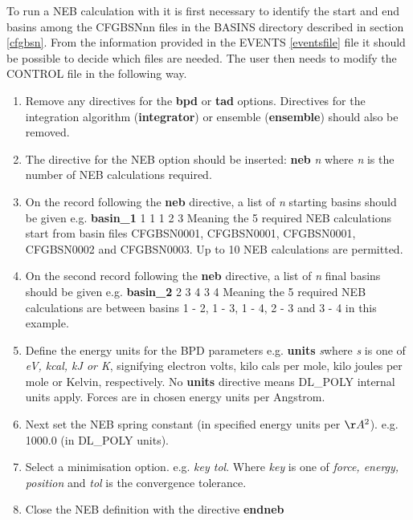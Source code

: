 To run a NEB calculation with \D{} it is first necessary to identify the
start and end basins among the CFGBSNnn files in the BASINS directory
described in section \ref{cfgbsn}. From the information provided in
the EVENTS \ref{eventsfile} file it should be possible to decide which
files are needed. The user then needs to modify the CONTROL file in
the following way.
\begin{enumerate}
\item Remove any directives for the {\bf bpd} or {\bf tad}
options. Directives for the integration algorithm ({\bf integrator}) or
ensemble ({\bf ensemble}) should also be removed.
\item The directive for the NEB option should be inserted: \newline
{\bf neb} {\em n} \newline
where {\em n} is the number of NEB calculations required.
\item On the record following the {\bf neb} directive, a list of 
{\em n} starting basins  should be given e.g.\newline
{\bf basin\_1} 1 1 1 2 3 \newline
Meaning the 5 required NEB calculations start from basin files
CFGBSN0001, CFGBSN0001, CFGBSN0001, CFGBSN0002 and CFGBSN0003. Up to
10 NEB calculations are permitted.
\item On the second record following the {\bf neb} directive, a list of 
{\em n} final basins should be given e.g.\newline
{\bf basin\_2} 2 3 4 3 4 \newline
Meaning the 5 required NEB calculations are between basins 1 - 2, 1
- 3, 1 - 4, 2 - 3 and 3 - 4 in this example.
\item Define the energy units for the BPD parameters e.g. \newline
{\bf units} {\em s}\newline where {\em s} is one of {\em eV,
kcal, kJ or K}, signifying electron volts, kilo cals per mole,
kilo joules per mole or Kelvin, respectively. No {\bf units}
directive means DL\_POLY internal units apply. Forces are in
chosen energy units per Angstrom.
\item Next set the NEB spring constant (in specified energy units per $\AA^2$). 
e.g.  1000.0 (in DL\_POLY units).
\item Select a minimisation option.  e.g. 
 {\em key tol}.\newline 
Where {\em key} is one of {\em force, energy, position} and {\em
tol} is the convergence tolerance.
\item Close the NEB definition with the directive \newline
{\bf endneb}
\end{enumerate}

